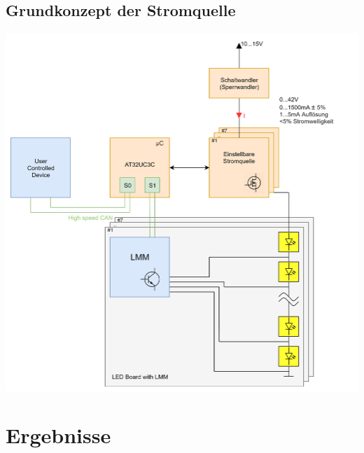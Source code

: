 \documentclass[paper=a4, 12pt]{scrreprt}
\begin{document}
	\section{Grundkonzept der Stromquelle}
	\begin{adjustbox}{center,caption={Grundkonzept der Stromquelle},label={fig:Grundkonzept},nofloat=figure,vspace=\bigskipamount}
		\includegraphics[height=\textwidth]{img/Diplomarbeit_Blockschaltbild.jpg}
		\hfill \break
	\end{adjustbox}
	
	
\chapter{Ergebnisse}
\end{document}
